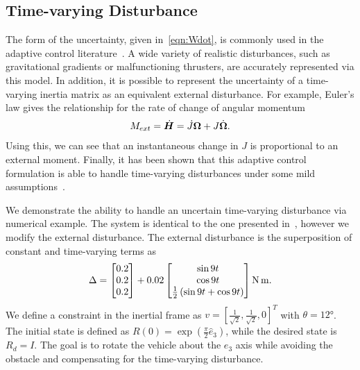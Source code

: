 \documentclass[10pt,fleqn]{IJCAS}  %
\begin{document}
\begin{multicols}{2}
\subsection{Time-varying Disturbance}\label{ssec:time_varying}

The form of the uncertainty, given in~\cref{eqn:Wdot}, is commonly used in the adaptive control literature~\cite{LeeITCST13,ioannou2012}. 
A wide variety of realistic disturbances, such as gravitational gradients or malfunctioning thrusters, are accurately represented via this model. 
In addition, it is possible to represent the uncertainty of a time-varying inertia matrix as an equivalent external disturbance. 
For example, Euler's law gives the relationship for the rate of change of angular momentum
\begin{align*}
    M_{ext} = \dot{\bm{H}} = \dot{J} \bm{\Omega} + J \dot{\bm{\Omega}} .
\end{align*}
Using this, we can see that an instantaneous change in \( J \) is proportional to an external moment.
Finally, it has been shown that this adaptive control formulation is able to handle time-varying disturbances under some mild assumptions~\cite{ioannou2012}. 

We demonstrate the ability to handle an uncertain time-varying disturbance via numerical example.
The system is identical to the one presented in~, however we modify the external disturbance. 
The external disturbance is the superposition of constant and time-varying terms as
\begin{align*}
    \Delta = \begin{bmatrix} 0.2 \\ 0.2 \\0.2 \end{bmatrix} + 0.02 \begin{bmatrix} \sin 9 t \\ \cos 9 t \\ \frac{1}{2} \left( \sin 9t + \cos 9t \right)\end{bmatrix} \si{\newton\meter}.
\end{align*}
We define a constraint in the inertial frame as \( v = [\frac{1}{\sqrt{2}}, \frac{1}{\sqrt{2}}, 0]^T \) with \( \theta = \ang{12} \).
The initial state is defined as \(R(0) = \exp( \frac{\pi}{2} \hat{e}_3) \), while the desired state is \(R_d =I \).
The goal is to rotate the vehicle about the \( e_3 \) axis while avoiding the obstacle and compensating for the time-varying disturbance. 


\end{multicols}
\end{document}
